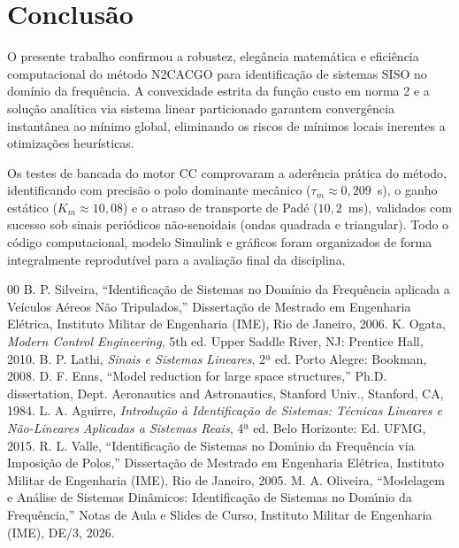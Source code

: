 \documentclass[journal,10pt,twocolumn]{IEEEtran}
\begin{document}
\section{Conclusão}
O presente trabalho confirmou a robustez, elegância matemática e eficiência computacional do método N2CACGO para identificação de sistemas SISO no domínio da frequência. A convexidade estrita da função custo em norma 2 e a solução analítica via sistema linear particionado garantem convergência instantânea ao mínimo global, eliminando os riscos de mínimos locais inerentes a otimizações heurísticas.

Os testes de bancada do motor CC comprovaram a aderência prática do método, identificando com precisão o polo dominante mecânico ($\tau_m \approx 0,209$~s), o ganho estático ($K_m \approx 10,08$) e o atraso de transporte de Padé ($10,2$~ms), validados com sucesso sob sinais periódicos não-senoidais (ondas quadrada e triangular). Todo o código computacional, modelo Simulink e gráficos foram organizados de forma integralmente reprodutível para a avaliação final da disciplina.

\begin{thebibliography}{00}
 B. P. Silveira, ``Identificação de Sistemas no Domínio da Frequência aplicada a Veículos Aéreos Não Tripulados,'' Dissertação de Mestrado em Engenharia Elétrica, Instituto Militar de Engenharia (IME), Rio de Janeiro, 2006.
 K. Ogata, \textit{Modern Control Engineering}, 5th ed. Upper Saddle River, NJ: Prentice Hall, 2010.
 B. P. Lathi, \textit{Sinais e Sistemas Lineares}, 2ª ed. Porto Alegre: Bookman, 2008.
 D. F. Enns, ``Model reduction for large space structures,'' Ph.D. dissertation, Dept. Aeronautics and Astronautics, Stanford Univ., Stanford, CA, 1984.
 L. A. Aguirre, \textit{Introdução à Identificação de Sistemas: Técnicas Lineares e Não-Lineares Aplicadas a Sistemas Reais}, 4ª ed. Belo Horizonte: Ed. UFMG, 2015.
 R. L. Valle, ``Identifica\c{c}\~{a}o de Sistemas no Dom\'{\i}nio da Frequ\^{e}ncia via Imposi\c{c}\~{a}o de Polos,'' Disserta\c{c}\~{a}o de Mestrado em Engenharia El\'{e}trica, Instituto Militar de Engenharia (IME), Rio de Janeiro, 2005.
 M. A. Oliveira, ``Modelagem e An\'{a}lise de Sistemas Din\^{a}micos: Identifica\c{c}\~{a}o de Sistemas no Dom\'{\i}nio da Frequ\^{e}ncia,'' Notas de Aula e Slides de Curso, Instituto Militar de Engenharia (IME), DE/3, 2026.
\end{thebibliography}
\end{document}
